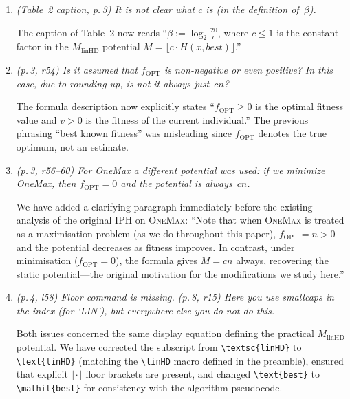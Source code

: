 \documentclass[11pt]{article}
\newcommand{\RC}[1]{\textcolor{revcolor}{\textit{#1}}}
\newcommand{\resp}[1]{\smallskip\noindent #1\medskip}
\begin{document}
\begin{enumerate}[label=\textbf{P\arabic*.},leftmargin=*]

\item \RC{(Table~2 caption, p.\,3) It is not clear what $c$ is (in the
definition of~$\beta$).}

\resp{The caption of Table~2 now reads
``$\beta := \log_2 \tfrac{20}{c}$, where $c\le 1$ is the constant factor in
the $M_{\text{linHD}}$ potential
$M = \lfloor c\cdot H(x,\mathit{best})\rfloor$.''}

\item \RC{(p.\,3, r54) Is it assumed that $f_{\mathrm{OPT}}$ is non-negative or
even positive? In this case, due to rounding up, is not it always just~$cn$?}

\resp{The formula description now explicitly states
``$f_{\text{OPT}}\ge 0$ is the optimal fitness value and $v>0$ is the fitness
of the current individual.''  The previous phrasing ``best known fitness''
was misleading since $f_{\text{OPT}}$ denotes the true optimum, not an estimate.}

\item \RC{(p.\,3, r56--60) For OneMax a different potential was used: if we
minimize OneMax, then $f_{\mathrm{OPT}}=0$ and the potential is always~$cn$.}

\resp{We have added a clarifying paragraph immediately before the existing
analysis of the original IPH on \textsc{OneMax}: ``Note that when
\textsc{OneMax} is treated as a maximisation problem (as we do throughout this
paper), $f_{\text{OPT}}=n>0$ and the potential decreases as fitness improves.
In contrast, under minimisation ($f_{\text{OPT}}=0$), the formula gives
$M=cn$ always, recovering the static potential---the original motivation for
the modifications we study here.''}

\item \RC{(p.\,4, l58) Floor command is missing.
\newline
(p.\,8, r15) Here you use smallcaps in the index (for `LIN'), but everywhere
else you do not do this.}

\resp{Both issues concerned the same display equation defining the practical
$M_{\text{linHD}}$ potential.  We have corrected the subscript from
\texttt{\textbackslash textsc\{linHD\}} to
\texttt{\textbackslash text\{linHD\}} (matching the \texttt{\textbackslash linHD}
macro defined in the preamble), ensured that explicit
$\lfloor\cdot\rfloor$ floor brackets are present, and changed
\texttt{\textbackslash text\{best\}} to
\texttt{\textbackslash mathit\{best\}} for consistency with the algorithm
pseudocode.}


\end{enumerate}
\end{document}
